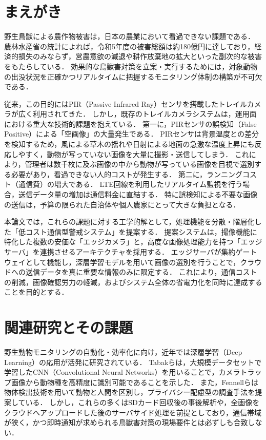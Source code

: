 \documentclass[technicalreport]{ieicej}
\begin{document}
\maketitle

\section{まえがき}
野生鳥獣による農作物被害は，日本の農業において看過できない課題である．
農林水産省の統計によれば，令和5年度の被害総額は約180億円に達しており，経済的損失のみならず，営農意欲の減退や耕作放棄地の拡大といった副次的な被害をもたらしている\cite{maff}．
効果的な鳥獣害対策を立案・実行するためには，対象動物の出没状況を正確かつリアルタイムに把握するモニタリング体制の構築が不可欠である．

従来，この目的にはPIR（Passive Infrared Ray）センサを搭載したトレイルカメラが広く利用されてきた．
しかし，既存のトレイルカメラシステムは，運用面における重大な技術的課題を抱えている．
第一に，PIRセンサの誤検知（False Positive）による「空画像」の大量発生である．
PIRセンサは背景温度との差分を検知するため，風による草木の揺れや日射による地面の急激な温度上昇にも反応しやすく，動物が写っていない画像を大量に撮影・送信してしまう．
これにより，管理者は数千枚に及ぶ画像の中から動物が写っている画像を目視で選別する必要があり，看過できない人的コストが発生する．
第二に，ランニングコスト（通信費）の増大である．
LTE回線を利用したリアルタイム監視を行う場合，送信データ量の増加は通信料金に直結する．
特に誤検知による不要な画像の送信は，予算の限られた自治体や個人農家にとって大きな負担となる．

本論文では，これらの課題に対する工学的解として，処理機能を分散・階層化した「低コスト通信型警戒システム」を提案する．
提案システムは，撮像機能に特化した複数の安価な「エッジカメラ」と，高度な画像処理能力を持つ「エッジサーバ」を連携させるアーキテクチャを採用する．
エッジサーバが集約ゲートウェイとして機能し，深層学習モデルを用いて画像の選別を行うことで，クラウドへの送信データを真に重要な情報のみに限定する．
これにより，通信コストの削減，画像確認労力の軽減，およびシステム全体の省電力化を同時に達成することを目的とする．

\section{関連研究とその課題}
野生動物モニタリングの自動化・効率化に向け，近年では深層学習（Deep Learning）の応用が活発に研究されている．
Tabakら\cite{Tabak2019}は，大規模データセットで学習したCNN（Convolutional Neural Networks）を用いることで，カメラトラップ画像から動物種を高精度に識別可能であることを示した．
また，Fennellら\cite{Fennell2022}は物体検出技術を用いて動物と人間を区別し，プライバシー配慮型の調査手法を提案している．
しかし，これらの多くはSDカード回収後の事後解析や，全画像をクラウドへアップロードした後のサーバサイド処理を前提としており，通信帯域が狭く，かつ即時通知が求められる鳥獣害対策の現場要件とは必ずしも合致しない．
\end{document}
